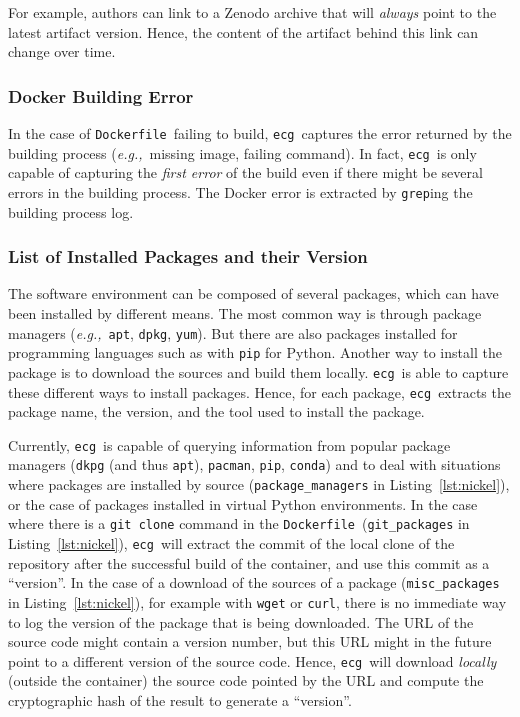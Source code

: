 \documentclass[sigconf,natbib=false]{acmart}
\newcommand{\eg}{\emph{e.g.,}}
\newcommand{\df}{\texttt{Dockerfile}}
\newcommand{\ecg}{\texttt{ecg}}
\begin{document}
For example, authors can link to a Zenodo archive that will \emph{always} point to the latest artifact version.%
Hence, the content of the artifact behind this link can change over time.

\subsubsection{Docker Building Error}

In the case of \df\ failing to build, \ecg\ captures the error returned by the building process (\eg\ missing image, failing command).
In fact, \ecg\ is only capable of capturing the \emph{first error} of the build even if there might be several errors in the building process.
The Docker error is extracted by \texttt{grep}ing the building process log.

\subsubsection{List of Installed Packages and their Version}

The software environment can be composed of several packages, which can have been installed by different means.
The most common way is through package managers (\eg\ \texttt{apt}, \texttt{dpkg}, \texttt{yum}).
But there are also packages installed for programming languages such as with \texttt{pip} for Python.
Another way to install the package is to download the sources and build them locally.
\ecg\ is able to capture these different ways to install packages.
Hence, for each package, \ecg\ extracts the package name, the version, and the tool used to install the package.

Currently, \ecg\ is capable of querying information from popular package managers (\texttt{dkpg} (and thus \texttt{apt}), \texttt{pacman}, \texttt{pip}, \texttt{conda}) and to deal with situations where packages are installed by source (\texttt{package\_managers} in Listing~\ref{lst:nickel}), or the case of packages installed in virtual Python environments.
In the case where there is a \texttt{git clone} command in the \df\ (\texttt{git\_packages} in Listing~\ref{lst:nickel}), \ecg\ will extract the commit of the local clone of the repository after the successful build of the container, and use this commit as a ``version''.
In the case of a download of the sources of a package (\texttt{misc\_packages} in Listing~\ref{lst:nickel}), for example with \texttt{wget} or \texttt{curl}, there is no immediate way to log the version of the package that is being downloaded.
The URL of the source code might contain a version number, but this URL might in the future point to a different version of the source code.
Hence, \ecg\ will download \emph{locally} (outside the container) the source code pointed by the URL and compute the cryptographic hash of the result to generate a ``version''.
\end{document}

